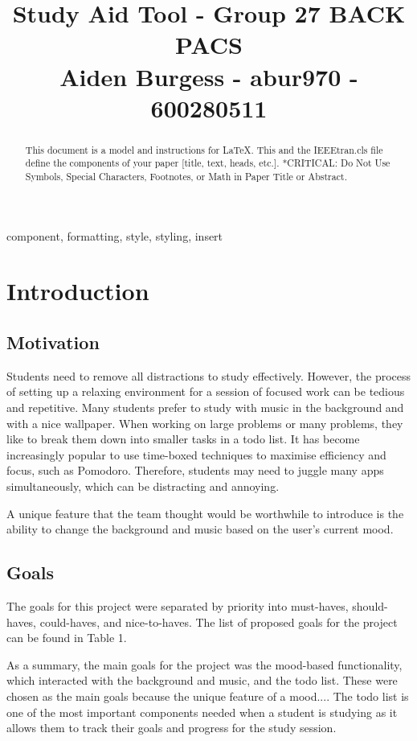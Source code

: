 \documentclass[conference]{IEEEtran}
\begin{document}
\title{Study Aid Tool - Group 27 BACK PACS \\
{\large Aiden Burgess - abur970 - 600280511}
}
\maketitle
\begin{abstract}
This document is a model and instructions for \LaTeX.
This and the IEEEtran.cls file define the components of your paper [title, text, heads, etc.]. *CRITICAL: Do Not Use Symbols, Special Characters, Footnotes, 
or Math in Paper Title or Abstract.
\end{abstract}

\begin{IEEEkeywords}
component, formatting, style, styling, insert
\end{IEEEkeywords}

\section{Introduction}


\subsection{Motivation}
Students need to remove all distractions to study effectively. However, the process of setting up a relaxing environment for a session of focused work can be tedious and repetitive. Many students prefer to study with music in the background and with a nice wallpaper. When working on large problems or many problems, they like to break them down into smaller tasks in a todo list. It has become increasingly popular to use time-boxed techniques to maximise efficiency and focus, such as Pomodoro. Therefore, students may need to juggle many apps simultaneously, which can be distracting and annoying.

A unique feature that the team thought would be worthwhile to introduce is the ability to change the background and music based on the user's current mood.

\subsection{Goals}
The goals for this project were separated by priority into must-haves, should-haves, could-haves, and nice-to-haves. The list of proposed goals for the project can be found in Table 1.

As a summary, the main goals for the project was the mood-based functionality, which interacted with the background and music, and the todo list. These were chosen as the main goals because the unique feature of a mood.... The todo list is one of the most important components needed when a student is studying as it allows them to track their goals and progress for the study session.
\end{document}
